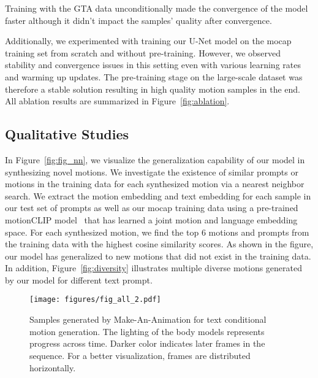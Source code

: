 \documentclass[10pt,twocolumn,letterpaper]{article}
\begin{document}
Training with the GTA data unconditionally made the convergence of the model faster although it didn't impact the samples' quality after convergence. 

Additionally, we experimented with training our U-Net model on the mocap training set from scratch and without pre-training. However, we observed stability and convergence issues in this setting even with various learning rates and warming up updates. The pre-training stage on the large-scale dataset was therefore a stable solution resulting in high quality motion samples in the end. All ablation results are summarized in Figure~\ref{fig:ablation}.



\subsection{Qualitative Studies}
In Figure~\ref{fig:fig_nn}, we visualize the generalization capability of our model in synthesizing novel motions. We investigate the existence of similar prompts or motions in the training data for each synthesized motion via a nearest neighbor search. We extract the motion embedding and text embedding for each sample in our test set of prompts as well as our mocap training data using a pre-trained motionCLIP model~\cite{tevet2022motionclip, kim2022flame} that has learned a joint motion and language embedding space. For each synthesized motion, we find the top 6 motions and prompts from the training data with the highest cosine similarity scores. As shown in the figure, our model has generalized to new motions that did not exist in the training data. In addition, Figure~\ref{fig:diversity} illustrates multiple diverse motions generated by our model for different text prompt.



\begin{figure*}
  \centering \texttt{[image: figures/fig\_all\_2.pdf]}
  \caption{Samples generated by Make-An-Animation for text conditional motion generation. The lighting of the body models represents progress across time. Darker color indicates later frames in the sequence. For a better visualization, frames are distributed horizontally. }
  \label{fig:samples}
\end{figure*}
\end{document}

